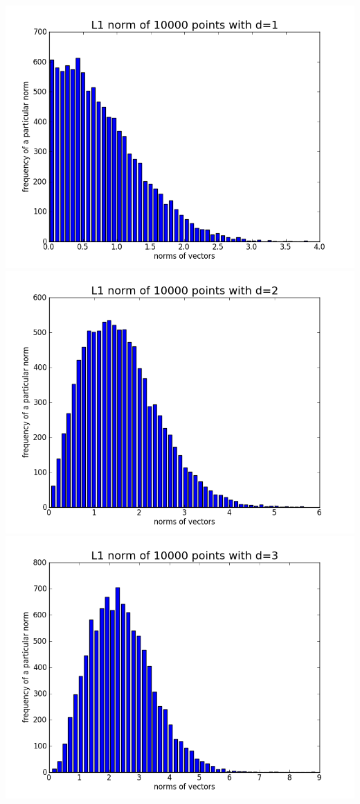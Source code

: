 \documentclass[11pt]{article}
\begin{document}
\begin{center}
\includegraphics[scale=0.25]{p1d1.png}
\includegraphics[scale=0.25]{p1d2.png}
\includegraphics[scale=0.25]{p1d3.png}

\end{center}
\end{document}
